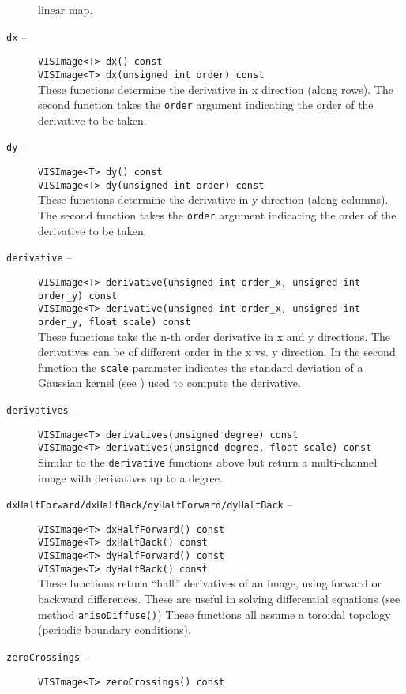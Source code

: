 \begin{description}
linear map.
\item[{\tt dx} --]
{\tt VISImage<T> dx() const}\\
{\tt VISImage<T> dx(unsigned int order) const}\\
These functions determine the derivative in x direction (along rows).
The second function takes the {\tt order} argument indicating
the order of the derivative to be taken.
\item[{\tt dy} --]
{\tt VISImage<T> dy() const}\\
{\tt VISImage<T> dy(unsigned int order) const}\\
These functions determine the derivative in y direction (along columns).
The second function takes the {\tt order} argument indicating
the order of the derivative to be taken.
\item[{\tt derivative} --]
{\tt VISImage<T> derivative(unsigned int order\_x, unsigned int order\_y) const}\\
{\tt VISImage<T> derivative(unsigned int order\_x, unsigned int order\_y, float scale) const}\\
These functions take the n-th order derivative in x and y directions.
The derivatives can be of different order in the x vs. y direction.
In the second function the {\tt scale} parameter indicates the standard deviation of a Gaussian kernel (see \cite{Lindeberg90}) used to compute the derivative.
\item[{\tt derivatives} --]
{\tt VISImage<T> derivatives(unsigned degree) const}\\
{\tt VISImage<T> derivatives(unsigned degree, float scale) const}\\
Similar to the {\tt derivative} functions above but return a
multi-channel image with derivatives up to a degree.
\item[{\tt dxHalfForward/dxHalfBack/dyHalfForward/dyHalfBack} --]
{\tt VISImage<T> dxHalfForward() const}\\
{\tt VISImage<T> dxHalfBack() const}\\
{\tt VISImage<T> dyHalfForward() const}\\
{\tt VISImage<T> dyHalfBack() const}\\
These functions return ``half'' derivatives of an image, using forward or 
backward differences.
These are useful in solving differential equations (see method 
{\tt anisoDiffuse()})
These functions all assume a toroidal topology (periodic boundary conditions).
\item[{\tt zeroCrossings} --]
{\tt VISImage<T> zeroCrossings() const}\\

\end{description}
